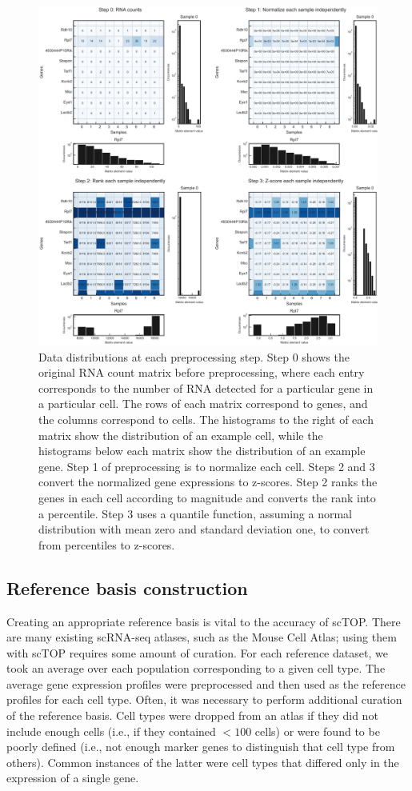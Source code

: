 \documentclass[aps,superscriptaddress, notitlepage,longbibliography]{revtex4-1}
\begin{document}
\begin{figure}
	\centering
		\includegraphics[scale=0.6]{figs/fig1a supplement.pdf}
	\caption{Data distributions at each preprocessing step. Step 0 shows the original RNA count matrix before preprocessing, where each entry corresponds to the number of RNA detected for a particular gene in a particular cell. The rows of each matrix correspond to genes, and the columns correspond to cells. The histograms to the right of each matrix show the distribution of an example cell, while the histograms below each matrix show the distribution of an example gene. Step 1 of preprocessing is to normalize each cell. Steps 2 and 3 convert the normalized gene expressions to z-scores. Step 2 ranks the genes in each cell according to magnitude and converts the rank into a percentile. Step 3 uses a quantile function, assuming a normal distribution with mean zero and standard deviation one, to convert from percentiles to z-scores.}
	\label{FIG:supp1}
\end{figure}

\subsection{Reference basis construction}\label{basis construction}
Creating an appropriate reference basis is vital to the accuracy of scTOP. There are many existing scRNA-seq atlases, such as the Mouse Cell Atlas; using them with scTOP requires some amount of curation. For each reference dataset, we took an average over each population corresponding to a given cell type. The average gene expression profiles were preprocessed and then used as the reference profiles for each cell type. Often, it was necessary to perform additional curation of the reference basis. Cell types were dropped from an atlas if they did not include enough cells (i.e., if they contained $<100$ cells) or were found to be poorly defined (i.e., not enough marker genes to distinguish that cell type from others). Common instances of the latter were cell types that differed only in the expression of a single gene.
\end{document}
